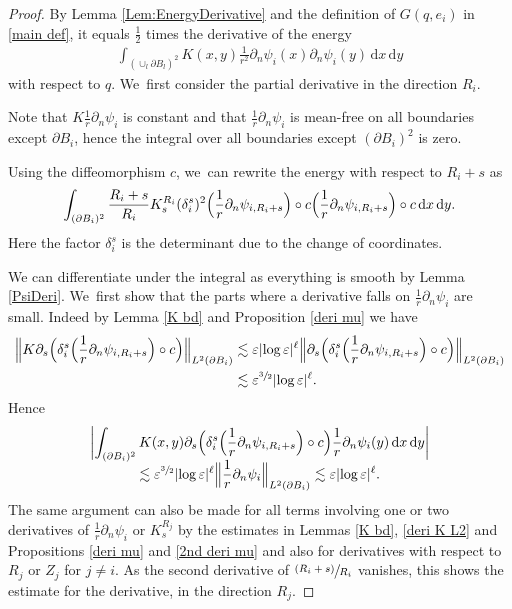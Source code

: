 \documentclass[10pt]{amsart}
\let\epsilon\varepsilon
\newcommand{\psfrac}[2]{\sfrac{(#1)}{#2}}
\theoremstyle{definition}
\newcommand\Bnorm[1]{\Bigl\lVert #1\Bigr\rVert}
\newcommand\dd{\,\mathrm{d}}
\newcommand\dx{\dd x}
\newcommand\dy{\dd y}
\let\de\partial
\let\eps\epsilon
\begin{document}
\begin{proof}
By Lemma \ref{Lem:EnergyDerivative} and the definition of $G(q,e_i)$ in \ref{main def}, it equals $\frac{1}{2}$ times the derivative of the energy
\begin{align*}
\int_{(\cup_l \de B_l)^2}K(x,y)\frac{1}{r^2}\de_n\psi_i(x)\de_n\psi_i(y)\dx\dy
\end{align*}
with respect to $q$. We~first consider the partial derivative in the direction $R_i$.

Note that $K\frac{1}{r}\de_n\psi_i$ is constant and that $\frac{1}{r}\de_n\psi_i$ is mean-free on all boundaries except $\de B_i$, hence the integral over all boundaries except $(\de B_i)^2$ is zero.

Using the diffeomorphism $c$, we~can rewrite the energy with respect to $R_i+s$ as
\begin{align*}
\int_{(\de B_i)^2}\frac{R_i+s}{R_i}K_s^{R_i}(\delta_i^s)^2\Bigl(\frac{1}{r}\de_n\psi_{i,R_i+s}\Bigr)\circ c\Bigl(\frac{1}{r}\de_n\psi_{i,R_i+s}\Bigr)\circ c\dx\dy.
\end{align*}
Here the factor $\delta_i^s$ is the determinant due to the change of coordinates.

We can differentiate under the integral as everything is smooth by Lemma \ref{PsiDeri}. We~first show that the parts where a derivative falls on $\frac{1}{r}\de_n\psi_i$ are small. Indeed by Lemma \ref{K bd} and Proposition \ref{deri mu} we have
\begin{align*}
\Bnorm{K\de_s\Bigl(\delta_i^s\Bigl(\frac{1}{r}\de_n\psi_{i,R_i+s}\Bigr)\circ c\Bigr)}_{L^2(\de B_i)}&\lesssim \eps|{\log\eps}|^\ell \Bnorm{\de_s\Bigl(\delta_i^s\Bigl(\frac{1}{r}\de_n\psi_{i,R_i+s}\Bigr)\circ c\Bigr)}_{L^2(\de B_i)}\\
&\lesssim \eps^{\sfrac{3}{2}}|{\log\eps}|^\ell.
\end{align*}
Hence
\begin{multline*}
\biggl|\int_{(\de B_i)^2}K(x,y)\de_s\Bigl(\delta_i^s\Bigl(\frac{1}{r}\de_n\psi_{i,R_i+s}\Bigr)\circ c\Bigr)\frac{1}{r}\de_n\psi_i(y)\dx\dy\biggr|\\[-5pt]
\lesssim \eps^{\sfrac{3}{2}}|{\log\eps}|^\ell\Bnorm{\frac{1}{r}\de_n\psi_i}_{L^2(\de B_i)}
\lesssim \eps|{\log\eps}|^\ell.
\end{multline*}
The same argument can also be made for all terms involving one or two derivatives of $\frac{1}{r}\de_n\psi_i$ or $K_s^{R_j}$ by the estimates in Lemmas \ref{K bd}, \ref{deri K L2} and Propositions \ref{deri mu} and \ref{2nd deri mu} and also for derivatives with respect to $R_j$ or $Z_j$ for $j\neq i$. As the second derivative of $\psfrac{R_i+s}{R_i}$ vanishes, this shows the estimate for the derivative, in the direction $R_j$.


\end{proof}
\end{document}
